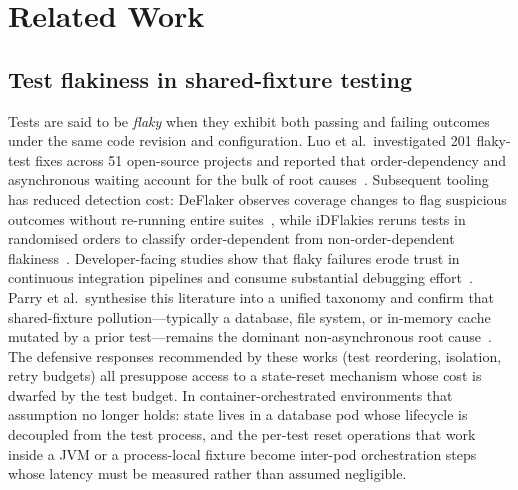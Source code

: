 
\section{Related Work}
\label{sec:related}

\subsection{Test flakiness in shared-fixture testing}
\label{sec:related:flakiness}

Tests are said to be \emph{flaky} when they exhibit both passing and failing
outcomes under the same code revision and configuration. Luo et al.\
investigated 201 flaky-test fixes across 51 open-source projects and reported
that order-dependency and asynchronous waiting account for the bulk of root
causes~\cite{luo2014empirical}. Subsequent tooling has reduced detection cost:
DeFlaker observes coverage changes to flag suspicious outcomes without
re-running entire suites~\cite{bell2018deflaker}, while iDFlakies reruns tests
in randomised orders to classify order-dependent from non-order-dependent
flakiness~\cite{lam2019idflakies}. Developer-facing studies show that flaky
failures erode trust in continuous integration pipelines and consume
substantial debugging effort~\cite{eck2019understanding}. Parry et al.\
synthesise this literature into a unified taxonomy and confirm that
shared-fixture pollution---typically a database, file system, or in-memory
cache mutated by a prior test---remains the dominant non-asynchronous root
cause~\cite{parry2022survey}. The defensive responses recommended by these
works (test reordering, isolation, retry budgets) all presuppose access to
a state-reset mechanism whose cost is dwarfed by the test budget. In
container-orchestrated environments that assumption no longer holds:
state lives in a database pod whose lifecycle is decoupled from the test
process, and the per-test reset operations that work inside a JVM or a
process-local fixture become inter-pod orchestration steps whose latency
must be measured rather than assumed negligible.

